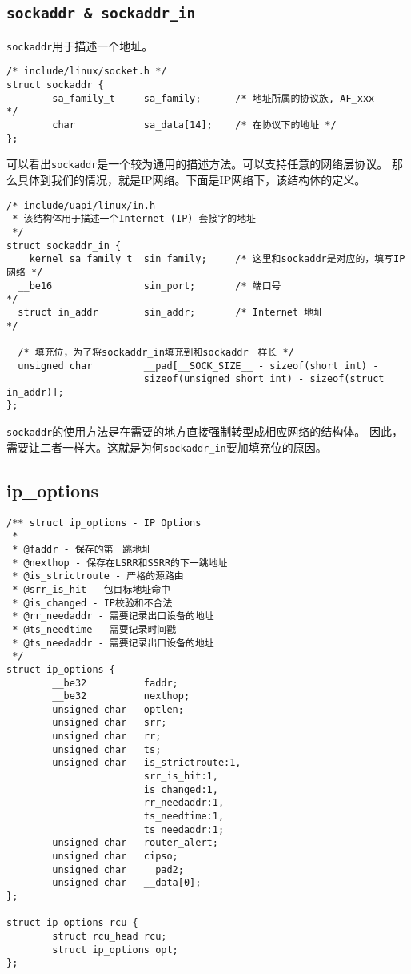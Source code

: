 \subsection{\texttt{sockaddr & sockaddr_in}}
\label{subsec:sockaddr_and_sockaddr_in}
\texttt{sockaddr}用于描述一个地址。
\begin{verbatim}
/* include/linux/socket.h */
struct sockaddr {
        sa_family_t     sa_family;      /* 地址所属的协议族, AF_xxx       */
        char            sa_data[14];    /* 在协议下的地址 */
};
\end{verbatim}

可以看出\texttt{sockaddr}是一个较为通用的描述方法。可以支持任意的网络层协议。
那么具体到我们的情况，就是IP网络。下面是IP网络下，该结构体的定义。

\begin{verbatim}
/* include/uapi/linux/in.h
 * 该结构体用于描述一个Internet (IP) 套接字的地址 
 */
struct sockaddr_in {
  __kernel_sa_family_t  sin_family;     /* 这里和sockaddr是对应的，填写IP网络 */
  __be16                sin_port;       /* 端口号                           */
  struct in_addr        sin_addr;       /* Internet 地址                    */

  /* 填充位，为了将sockaddr_in填充到和sockaddr一样长 */
  unsigned char         __pad[__SOCK_SIZE__ - sizeof(short int) -
                        sizeof(unsigned short int) - sizeof(struct in_addr)];
};
\end{verbatim}

\texttt{sockaddr}的使用方法是在需要的地方直接强制转型成相应网络的结构体。
因此，需要让二者一样大。这就是为何\texttt{sockaddr_in}要加填充位的原因。

\subsection{ip\_options}
\label{subsec:ip_options}

\begin{verbatim}
/** struct ip_options - IP Options
 *
 * @faddr - 保存的第一跳地址
 * @nexthop - 保存在LSRR和SSRR的下一跳地址
 * @is_strictroute - 严格的源路由
 * @srr_is_hit - 包目标地址命中
 * @is_changed - IP校验和不合法
 * @rr_needaddr - 需要记录出口设备的地址
 * @ts_needtime - 需要记录时间戳
 * @ts_needaddr - 需要记录出口设备的地址
 */
struct ip_options {
        __be32          faddr;
        __be32          nexthop;
        unsigned char   optlen;
        unsigned char   srr;
        unsigned char   rr;
        unsigned char   ts;
        unsigned char   is_strictroute:1,
                        srr_is_hit:1,
                        is_changed:1,
                        rr_needaddr:1,
                        ts_needtime:1,
                        ts_needaddr:1;
        unsigned char   router_alert;
        unsigned char   cipso;
        unsigned char   __pad2;
        unsigned char   __data[0];
};

struct ip_options_rcu {
        struct rcu_head rcu;
        struct ip_options opt;
};
\end{verbatim}

